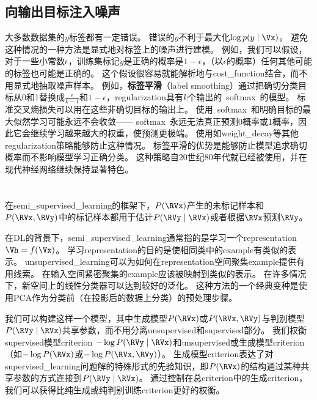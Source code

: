 \subsection{向输出目标注入噪声}
\label{sec:injecting_noise_at_the_output_targets}
大多数数据集的$y$标签都有一定错误。
错误的$y$不利于最大化$\log p(y \mid \Vx)$。
避免这种情况的一种方法是显式地对标签上的噪声进行建模。
例如，我们可以假设，对于一些小常数$\epsilon$，训练集标记$y$是正确的概率是$1-\epsilon$，（以$\epsilon$的概率）任何其他可能的标签也可能是正确的。
这个假设很容易就能解析地与\gls{cost_function}结合，而不用显式地抽取噪声样本。
例如，\textbf{标签平滑}（label smoothing）通过把确切分类目标从0和1替换成$\frac{\epsilon}{k-1}$和$1-\epsilon$，\gls{regularization}具有$k$个输出的~\gls{softmax}~的模型。
标准交叉熵损失可以用在这些非确切目标的输出上。
使用~\gls{softmax}~和明确目标的最大似然学习可能永远不会收敛——
\gls{softmax}~永远无法真正预测0概率或1概率，因此它会继续学习越来越大的权重，使预测更极端。
使用如\gls{weight_decay}等其他\gls{regularization}策略能够防止这种情况。
标签平滑的优势是能够防止模型追求确切概率而不影响模型学习正确分类。
这种策略自20世纪80年代就已经被使用，并在现代神经网络继续保持显著特色\citep{Szegedy-et-al-2015}。


\section{}
\label{sec:semi_supervised_learning}
在\gls{semi_supervised_learning}的框架下，$P(\RVx)$产生的未标记样本和$P(\RVx, \RVy)$中的标记样本都用于估计$P(\RVy \mid \RVx)$或者根据$\RVx$预测$\RVy$。

在\gls{DL}的背景下，\gls{semi_supervised_learning}通常指的是学习一个\gls{representation} $\Vh = f(\Vx)$。 
学习\gls{representation}的目的是使相同类中的\gls{example}有类似的表示。
\gls{unsupervised_learning}可以为如何在\gls{representation}空间聚集\gls{example}提供有用线索。
在输入空间紧密聚集的\gls{example}应该被映射到类似的表示。
在许多情况下，新空间上的线性分类器可以达到较好的泛化\citep{Belkin-Niyogi-2002,Chapelle-et-al-2003}。
这种方法的一个经典变种是使用\gls{PCA}作为分类前（在投影后的数据上分类）的预处理步骤。

我们可以构建这样一个模型，其中生成模型$P(\RVx)$或$P(\RVx, \RVy)$与判别模型$P(\RVy \mid \RVx)$共享参数，而不用分离\gls{unsupervised}和\gls{supervised}部分。
我们权衡\gls{supervised}模型\gls{criterion} $-\log P(\RVy \mid \RVx)$和\gls{unsupervised}或生成模型\gls{criterion}（如$-\log P(\RVx)$或$-\log P(\RVx, \RVy)$）。
生成模型\gls{criterion}表达了对\gls{supervised_learning}问题解的特殊形式的先验知识\citep{Lasserre-et-al-2006}，即$P(\RVx)$的结构通过某种共享参数的方式连接到$P(\RVy \mid \RVx)$。
通过控制在总\gls{criterion}中的生成\gls{criterion}，我们可以获得比纯生成或纯判别训练\gls{criterion}更好的权衡\citep{Lasserre-et-al-2006,Larochelle-Bengio-2008}。

